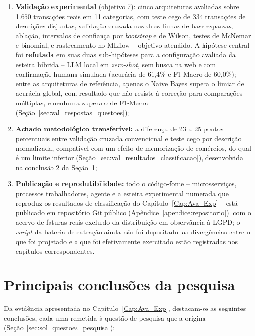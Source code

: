 \begin{enumerate}
	\item \textbf{Validação experimental} (objetivo 7): cinco arquiteturas avaliadas sobre 1.660 transações reais em 11 categorias, com teste cego de 334 transações de descrições disjuntas, validação cruzada nas duas linhas de base esparsas, ablação, intervalos de confiança por \textit{bootstrap} e de Wilson, testes de McNemar e binomial, e rastreamento no MLflow -- objetivo atendido. A hipótese central foi \textbf{refutada} em suas duas sub-hipóteses para a configuração avaliada da esteira híbrida -- LLM local em \textit{zero-shot}, sem busca na web e com confirmação humana simulada (acurácia de 61,4\% e F1-Macro de 60,0\%); entre as arquiteturas de referência, apenas o Naive Bayes supera o limiar de acurácia global, com resultado que não resiste à correção para comparações múltiplas, e nenhuma supera o de F1-Macro (Seção~\ref{sec:val_respostas_questoes});
	\item \textbf{Achado metodológico transferível:} a diferença de 23 a 25 pontos percentuais entre validação cruzada convencional e teste cego por descrição normalizada, compatível com um efeito de memorização de comércios, do qual é um limite inferior (Seção~\ref{sec:val_resultados_classificacao}), desenvolvida na conclusão 2 da Seção~\ref{sec:concl_principais_conclusoes};
	\item \textbf{Publicação e reprodutibilidade:} todo o código-fonte -- microsserviços, processos trabalhadores, agente e a esteira experimental numerada que reproduz os resultados de classificação do Capítulo~\ref{Cap:Ava_Exp} -- está publicado em repositório Git público (Apêndice~\ref{apendice:repositorio}), com o acervo de faturas reais excluído da distribuição em observância à LGPD; o \textit{script} da bateria de extração ainda não foi depositado; as divergências entre o que foi projetado e o que foi efetivamente exercitado estão registradas nos capítulos correspondentes.
\end{enumerate}

\section{Principais conclusões da pesquisa}
\label{sec:concl_principais_conclusoes}

Da evidência apresentada no Capítulo~\ref{Cap:Ava_Exp}, destacam-se as seguintes conclusões, cada uma remetida à questão de pesquisa que a origina (Seção~\ref{sec:sol_questoes_pesquisa}):


